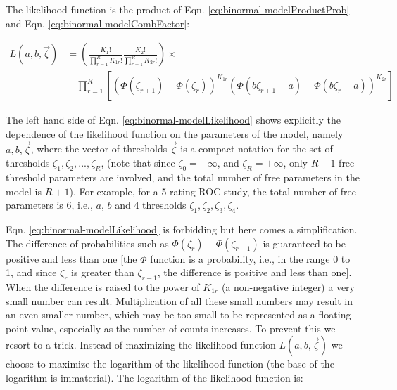 \documentclass[
]{book}
\begin{document}
The likelihood function is the product of Eqn. \eqref{eq:binormal-modelProductProb} and Eqn. \eqref{eq:binormal-modelCombFactor}:

\begin{equation} 
\begin{split}
L\left ( a,b,\overrightarrow{\zeta} \right ) &= \left (\frac{K_1!}{\prod_{r=1}^{R}K_{1r}!}\frac{K_2!}{\prod_{r=1}^{R}K_{2r}!}  \right ) \times \\
&\quad\prod_{r=1}^{R}\left [\left (\Phi\left ( \zeta_{r+1}  \right ) - \Phi\left ( \zeta_r  \right )  \right )^{K_{1r}} \left (\Phi\left ( b\zeta_{r+1}-a  \right ) - \Phi\left ( b\zeta_r-a  \right )  \right )^{K_{2r}}  \right ]
\end{split}
\label{eq:binormal-modelLikelihood}
\end{equation}

The left hand side of Eqn. \eqref{eq:binormal-modelLikelihood} shows explicitly the dependence of the likelihood function on the parameters of the model, namely \(a,b,\overrightarrow{\zeta}\), where the vector of thresholds \(\overrightarrow{\zeta}\) is a compact notation for the set of thresholds \(\zeta_1,\zeta_2,...,\zeta_R\), (note that since \(\zeta_0 = -\infty\), and \(\zeta_R = +\infty\), only \(R-1\) free threshold parameters are involved, and the total number of free parameters in the model is \(R+1\)). For example, for a 5-rating ROC study, the total number of free parameters is 6, i.e., \(a\), \(b\) and 4 thresholds \(\zeta_1,\zeta_2,\zeta_3,\zeta_4\).

Eqn. \eqref{eq:binormal-modelLikelihood} is forbidding but here comes a simplification. The difference of probabilities such as \(\Phi\left ( \zeta_r \right )-\Phi\left ( \zeta_{r-1} \right )\) is guaranteed to be positive and less than one {[}the \(\Phi\) function is a probability, i.e., in the range 0 to 1, and since \(\zeta_r\) is greater than \(\zeta_{r-1}\), the difference is positive and less than one{]}. When the difference is raised to the power of \(K_{1r}\) (a non-negative integer) a very small number can result. Multiplication of all these small numbers may result in an even smaller number, which may be too small to be represented as a floating-point value, especially as the number of counts increases. To prevent this we resort to a trick. Instead of maximizing the likelihood function \(L\left ( a,b,\overrightarrow{\zeta} \right )\) we choose to maximize the logarithm of the likelihood function (the base of the logarithm is immaterial). The logarithm of the likelihood function is:
\end{document}
